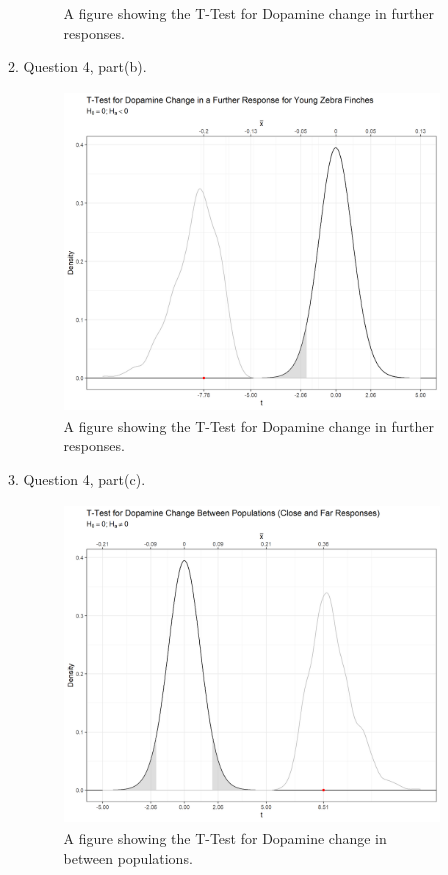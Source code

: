 \documentclass{article}\usepackage[]{graphicx}\usepackage[]{xcolor}
\begin{document}
\begin{enumerate}
\begin{enumerate}
\begin{figure}[H]
\caption{A figure showing the T-Test for Dopamine change in further responses.}
\label{plot2}
\end{figure}

  \item Question 4, part(b).
  \begin{figure}[H]
\centering
\includegraphics[width=10cm, height=8.5cm]{task5plot2.png}
\caption{A figure showing the T-Test for Dopamine change in further responses.}
\label{plot3}
\end{figure}

\newpage
\item Question 4, part(c).
   \begin{figure}[H]
\centering
\includegraphics[width=10cm, height=8.5cm]{task5plot3.png}
\caption{A figure showing the T-Test for Dopamine change in between populations.}
\label{plot4}
\end{figure}

\end{enumerate}
\end{enumerate}


\end{document}
